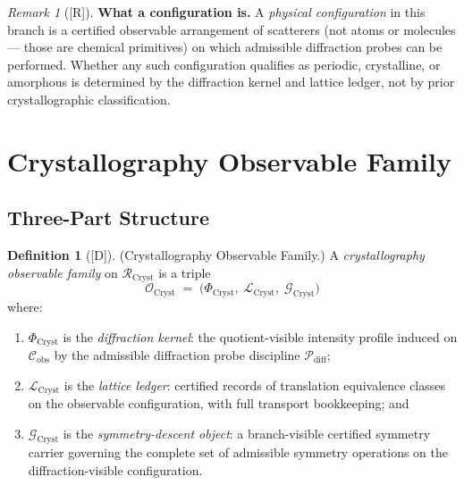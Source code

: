 \documentclass[12pt,oneside]{amsbook}
\theoremstyle{plain}
\theoremstyle{definition}
\newtheorem{definition}[theorem]{Definition}
\theoremstyle{remark}
\newtheorem{remark}[theorem]{Remark}
\newcommand{\status}[1]{\textup{[#1]}}
\begin{document}
\begin{remark}[\status{R}]\label{rem:cryst-configuration-note}
\textbf{What a configuration is.}
A \emph{physical configuration} in this branch is a certified
observable arrangement of scatterers (not atoms or molecules ---
those are chemical primitives) on which admissible diffraction
probes can be performed.  Whether any such configuration qualifies
as periodic, crystalline, or amorphous is determined by the
diffraction kernel and lattice ledger, not by prior crystallographic
classification.
\end{remark}

\section{Crystallography Observable Family}
\label{sec:cryst-obs-family}

\subsection{Three-Part Structure}

\begin{definition}[\status{D}]\label{def:cryst-obs-family}
\textup{(Crystallography Observable Family.)}
A \emph{crystallography observable family} on
$\mathcal{R}_{\mathrm{Cryst}}$ is a triple
\[
  \mathcal{O}_{\mathrm{Cryst}} \;=\;
  \bigl(\Phi_{\mathrm{Cryst}},\;
        \mathcal{L}_{\mathrm{Cryst}},\;
        \mathcal{G}_{\mathrm{Cryst}}\bigr)
\]
where:
\begin{enumerate}[label=\textup{(\arabic*)}]
  \item $\Phi_{\mathrm{Cryst}}$ is the \emph{diffraction kernel}: the
    quotient-visible intensity profile induced on
    $\mathcal{C}_{\mathrm{obs}}$ by the admissible diffraction probe
    discipline $\mathcal{P}_{\mathrm{diff}}$;
  \item $\mathcal{L}_{\mathrm{Cryst}}$ is the \emph{lattice ledger}:
    certified records of translation equivalence classes on the
    observable configuration, with full transport bookkeeping; and
  \item $\mathcal{G}_{\mathrm{Cryst}}$ is the \emph{symmetry-descent
    object}: a branch-visible certified symmetry carrier governing
    the complete set of admissible symmetry operations on the
    diffraction-visible configuration.
\end{enumerate}
\end{definition}
\end{document}
